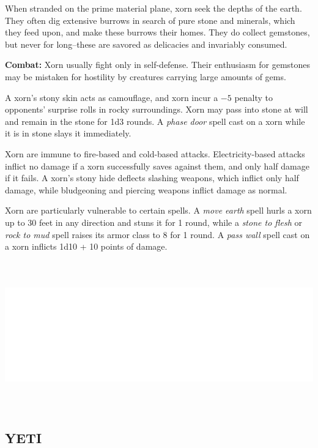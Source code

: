\begin{multicols}{2}
When stranded on the prime material plane, xorn seek the depths of the earth. They often dig extensive burrows in search of pure stone and minerals, which they feed upon, and make these burrows their homes. They do collect gemstones, but never for long--these are savored as delicacies and invariably consumed.

\textbf{Combat:} Xorn usually fight only in self-defense. Their enthusiasm for gemstones may be mistaken for hostility by creatures carrying large amounts of gems.

A xorn's stony skin acts as camouflage, and xorn incur a $-5$ penalty to opponents' surprise rolls in rocky surroundings. Xorn may pass into stone at will and remain in the stone for 1d3 rounds. A \textit{phase door} spell cast on a xorn while it is in stone slays it immediately.

Xorn are immune to fire-based and cold-based attacks. Electricity-based attacks inflict no damage if a xorn successfully saves against them, and only half damage if it fails. A xorn's stony hide deflects slashing weapons, which inflict only half damage, while bludgeoning and piercing weapons inflict damage as normal.

Xorn are particularly vulnerable to certain spells. A \textit{move earth} spell hurls a xorn up to 30 feet in any direction and stuns it for 1 round, while a \textit{stone to flesh} or \textit{rock to mud} spell raises its armor class to 8 for 1 round. A \textit{pass wall} spell cast on a xorn inflicts 1d10 + 10 points of damage.

\noindent\includegraphics[width=\columnwidth, height=2.5in]{testblock.pdf}

\noindent
\begin{minipage}{\columnwidth}

\vspace{1em}

\subsection{YETI}


\end{minipage}
\end{multicols}
